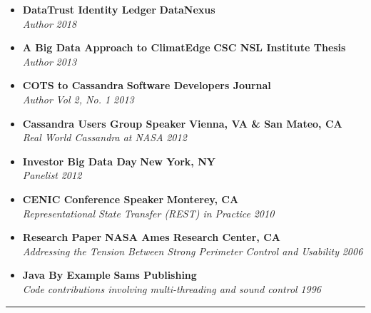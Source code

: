 \begin{itemize}
    \parskip=0.1em
    \item
    \headerrow
        {\textbf{DataTrust Identity Ledger}}
        {\textbf{DataNexus}}
    \\
    \headerrow
        {\emph{Author}}
        {\emph{2018}}
    \item
    \headerrow
        {\textbf{A Big Data Approach to ClimatEdge\texttrademark}}
        {\textbf{CSC NSL Institute Thesis}}
    \\
    \headerrow
        {\emph{Author}}
        {\emph{2013}}
    \item
	\headerrow
		{\textbf{COTS to Cassandra}}
		{\textbf{Software Developers Journal}}
	\\
	\headerrow
		{\emph{Author}}
		{\emph{Vol 2, No. 1 2013}}
    \item
	\headerrow
		{\textbf{Cassandra Users Group Speaker}}
		{\textbf{Vienna, VA \& San Mateo, CA}}
	\\
	\headerrow
		{\emph{Real World Cassandra at NASA}}
		{\emph{2012}}
	\item
	\headerrow
		{\textbf{Investor Big Data Day}}
		{\textbf{New York, NY}}
	\\
	\headerrow
		{\emph{Panelist}}
		{\emph{2012}}
	\item
    \headerrow
		{\textbf{CENIC Conference Speaker}}
		{\textbf{Monterey, CA}}
	\\
	\headerrow
		{\emph{Representational State Transfer (REST) in Practice}}
		{\emph{2010}}
	\item
	\headerrow
		{\textbf{Research Paper}}
		{\textbf{NASA Ames Research Center, CA}}
	\\
	\headerrow
		{\emph{Addressing the Tension Between Strong Perimeter Control and Usability}}
		{\emph{2006}}
	\item
	\headerrow
		{\textbf{Java By Example}}
		{\textbf{Sams Publishing}}
	\\
	\headerrow
		{\emph{Code contributions involving multi-threading and sound control}}
		{\emph{1996}}
\end{itemize}

\hrule
\vspace{-0.4em}

